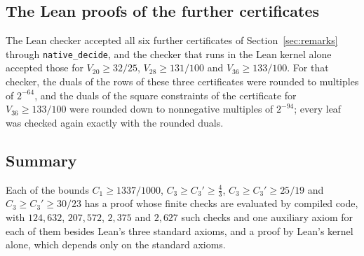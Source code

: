 \documentclass[11pt]{amsart}
\theoremstyle{definition}
\theoremstyle{remark}
\numberwithin{equation}{section}
\newcommand{\CthrPFrac}{\tfrac43}
\newcommand{\LeanSigSlash}{25/19}
\newcommand{\LeanSChecks}{2{,}375}
\newcommand{\LeanQChecks}{207{,}572}
\begin{document}
\subsection*{The Lean proofs of the further certificates} The Lean checker accepted all six further certificates of Section~\ref{sec:remarks} through \texttt{native\_decide}, and the checker that runs in the Lean kernel alone accepted those for $V_{20}\ge32/25$, $V_{28}\ge131/100$ and $V_{36}\ge133/100$. For that checker, the duals of the rows of these three certificates were rounded to multiples of $2^{-64}$, and the duals of the square constraints of the certificate for $V_{36}\ge133/100$ were rounded down to nonnegative multiples of $2^{-94}$; every leaf was checked again exactly with the rounded duals.

\subsection*{Summary} Each of the bounds $C_1\ge1337/1000$, $C_3\ge C_3'\ge\CthrPFrac$, $C_3\ge C_3'\ge\LeanSigSlash$ and $C_3\ge C_3'\ge30/23$ has a proof whose finite checks are evaluated by compiled code, with $124{,}632$, $\LeanQChecks$, $\LeanSChecks$ and $2{,}627$ such checks and one auxiliary axiom for each of them besides Lean's three standard axioms, and a proof by Lean's kernel alone, which depends only on the standard axioms.
\end{document}
